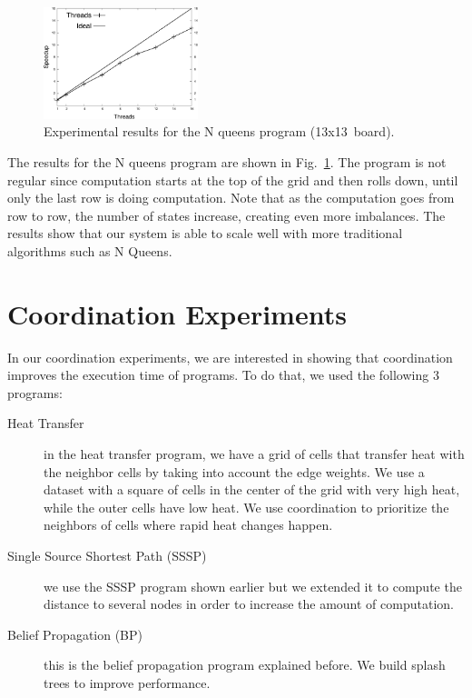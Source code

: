 \begin{figure}[h!]
     \centering
    \includegraphics[width=0.4\textwidth]{new-benchmarks/speedup_8queens-13.pdf}
    \caption{Experimental results for the N queens program (13x13~board).}
    \label{exp:8queens}
\end{figure}

The results for the N queens program are shown in Fig.~\ref{exp:8queens}. The program is not regular since computation starts at the top of the grid and then rolls down, until only the last row is doing computation. Note that as the computation goes from row to row, the number of states increase, creating even more imbalances. The results show that our system is able to scale well with more traditional algorithms such as N Queens.

\section{Coordination Experiments}

In our coordination experiments, we are interested in showing that coordination improves the execution time of programs.
To do that, we used the following 3 programs:

\begin{description}
   \item[Heat Transfer] in the heat transfer program, we have a grid of cells that transfer heat with the neighbor cells by taking into account the edge weights. We use a dataset with a square of cells in the center of the grid with very high heat, while the outer cells have low heat. We use coordination to prioritize the neighbors of cells where rapid heat changes happen.
   \item[Single Source Shortest Path (SSSP)] we use the SSSP program shown earlier but we extended it to compute the distance to several nodes in order to increase the amount of computation.
   \item[Belief Propagation (BP)] this is the belief propagation program explained before. We build splash trees to improve performance.
\end{description}

